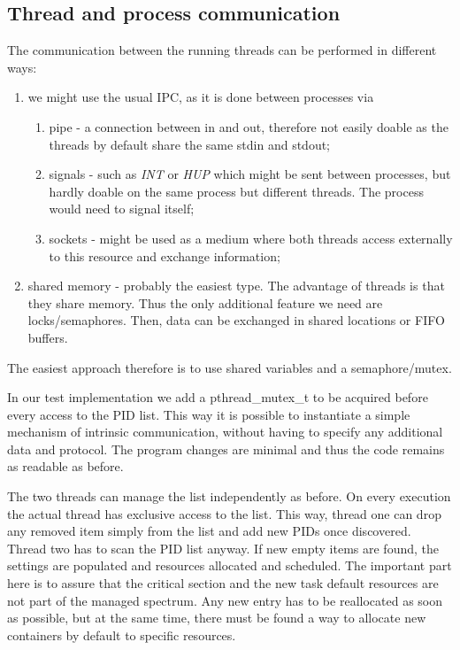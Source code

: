 \documentclass[]{scrartcl}
\begin{document}





\subsection{Thread and process communication}

The communication between the running threads can be performed in different ways:

\begin{enumerate}
	\item we might use the usual IPC, as it is done between processes via
	\begin{enumerate}
		\item pipe - a connection between in and out, therefore not easily doable as the threads by default share the same stdin and stdout;
		\item signals - such as \textit{INT} or \textit{HUP} which might be sent between processes, but hardly doable on the same process but different threads. The process would need to signal itself;
		\item sockets - might be used as a medium where both threads access externally to this resource and exchange information;
	\end{enumerate}
	\item shared memory - probably the easiest type. The advantage of threads is that they 
	share memory. Thus the only additional feature we need are locks/semaphores. Then, data can be exchanged in shared locations or FIFO buffers.
\end{enumerate}
The easiest approach therefore is to use shared variables and a semaphore/mutex.

In our test implementation we add a pthread\_mutex\_t to be acquired before every access to the PID list.
This way it is possible to instantiate a simple mechanism of intrinsic communication, without having to specify any additional data and protocol.
The program changes are minimal and thus the code remains as readable as before.

The two threads can manage the list independently as before. On every execution the actual thread has exclusive access to the list.
This way, thread one can drop any removed item simply from the list and add new PIDs once discovered. 
Thread two has to scan the PID list anyway.
If new empty items are found, the settings are populated and resources allocated and scheduled.
The important part here is to assure that the critical section and the new task default resources are not part of the managed spectrum.
Any new entry has to be reallocated as soon as possible, but at the same time, there must be found a way to allocate new containers by default to specific resources.
\end{document}
